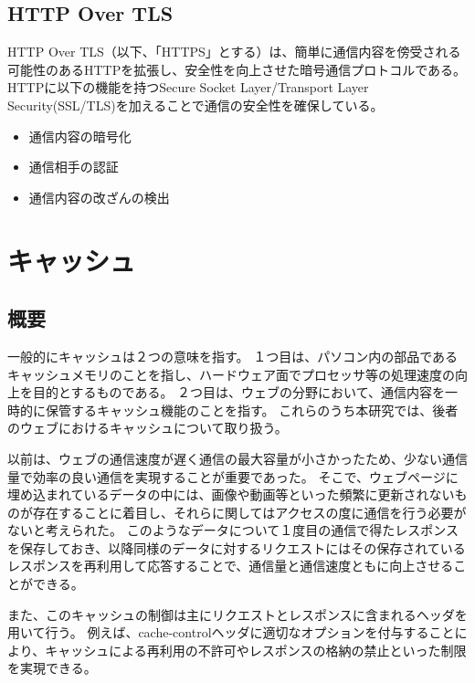 \documentclass[12pt,a4paper]{jbook}
\begin{document}
\subsection{HTTP Over TLS}
\label{sec:https}
HTTP Over TLS\cite{https}（以下、「HTTPS」とする）は、簡単に通信内容を傍受される可能性のあるHTTPを拡張し、安全性を向上させた暗号通信プロトコルである。
HTTPに以下の機能を持つSecure Socket Layer/Transport Layer Security(SSL/TLS)を加えることで通信の安全性を確保している。
\begin{itemize}
\item 通信内容の暗号化
\item 通信相手の認証
\item 通信内容の改ざんの検出
\end{itemize}

\section{キャッシュ}
\label{sec:cache}
\subsection{概要}
\color{red}
一般的にキャッシュは２つの意味を指す。
１つ目は、パソコン内の部品であるキャッシュメモリのことを指し、ハードウェア面でプロセッサ等の処理速度の向上を目的とするものである。
２つ目は、ウェブの分野において、通信内容を一時的に保管するキャッシュ機能のことを指す。
これらのうち本研究では、後者のウェブにおけるキャッシュについて取り扱う。

以前は、ウェブの通信速度が遅く通信の最大容量が小さかったため、少ない通信量で効率の良い通信を実現することが重要であった。
そこで、ウェブページに埋め込まれているデータの中には、画像や動画等といった頻繁に更新されないものが存在することに着目し、それらに関してはアクセスの度に通信を行う必要がないと考えられた。
このようなデータについて１度目の通信で得たレスポンスを保存しておき、以降同様のデータに対するリクエストにはその保存されているレスポンスを再利用して応答することで、通信量と通信速度ともに向上させることができる。
\color{black}

また、このキャッシュの制御は主にリクエストとレスポンスに含まれるヘッダを用いて行う。
例えば、cache-controlヘッダに適切なオプションを付与することにより、キャッシュによる再利用の不許可やレスポンスの格納の禁止といった制限を実現できる。
\end{document}
